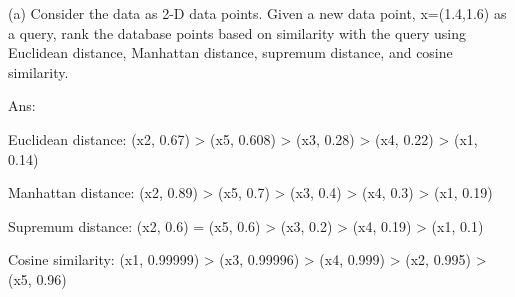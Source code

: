 	\begin{description}
		\item (a) Consider the data as 2-D data points. Given a new data point, x=(1.4,1.6) as a query,
		rank the database points based on similarity with the query using Euclidean distance,
		Manhattan distance, supremum distance, and cosine similarity.

		\vspace{0.5\baselineskip}

		Ans:

		\begin{description}
			\item Euclidean distance: (x2, 0.67) > (x5, 0.608) > (x3, 0.28) > (x4, 0.22) > (x1, 0.14)
			\vspace{0.5\baselineskip}
			\item Manhattan distance: (x2, 0.89) > (x5, 0.7) > (x3, 0.4) > (x4, 0.3) > (x1, 0.19)
			\vspace{0.5\baselineskip}
			\item Supremum distance: (x2, 0.6) = (x5, 0.6) > (x3, 0.2) > (x4, 0.19) > (x1, 0.1)
			\vspace{0.5\baselineskip}
			\item Cosine similarity: (x1, 0.99999) > (x3, 0.99996) > (x4, 0.999) > (x2, 0.995) > (x5, 0.96)
		\end{description}

	\end{description}

	\clearpage


